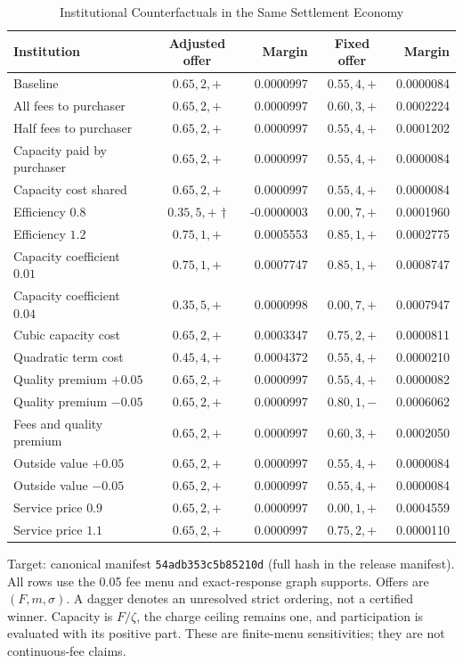 \begin{table}[t]
\caption{Institutional Counterfactuals in the Same Settlement Economy}\label{tab:institutions}
\centering
\footnotesize
\begin{tabular}{@{}lcrcr@{}}
\toprule
Institution & Adjusted offer & Margin & Fixed offer & Margin \\
\midrule
Baseline & $0.65,2,+$ & 0.0000997 & $0.55,4,+$ & 0.0000084 \\
All fees to purchaser & $0.65,2,+$ & 0.0000997 & $0.60,3,+$ & 0.0002224 \\
Half fees to purchaser & $0.65,2,+$ & 0.0000997 & $0.55,4,+$ & 0.0001202 \\
Capacity paid by purchaser & $0.65,2,+$ & 0.0000997 & $0.55,4,+$ & 0.0000084 \\
Capacity cost shared & $0.65,2,+$ & 0.0000997 & $0.55,4,+$ & 0.0000084 \\
Efficiency $0.8$ & $0.35,5,+$ $\dagger$ & -0.0000003 & $0.00,7,+$ & 0.0001960 \\
Efficiency $1.2$ & $0.75,1,+$ & 0.0005553 & $0.85,1,+$ & 0.0002775 \\
Capacity coefficient $0.01$ & $0.75,1,+$ & 0.0007747 & $0.85,1,+$ & 0.0008747 \\
Capacity coefficient $0.04$ & $0.35,5,+$ & 0.0000998 & $0.00,7,+$ & 0.0007947 \\
Cubic capacity cost & $0.65,2,+$ & 0.0003347 & $0.75,2,+$ & 0.0000811 \\
Quadratic term cost & $0.45,4,+$ & 0.0004372 & $0.55,4,+$ & 0.0000210 \\
Quality premium $+0.05$ & $0.65,2,+$ & 0.0000997 & $0.55,4,+$ & 0.0000082 \\
Quality premium $-0.05$ & $0.65,2,+$ & 0.0000997 & $0.80,1,-$ & 0.0006062 \\
Fees and quality premium & $0.65,2,+$ & 0.0000997 & $0.60,3,+$ & 0.0002050 \\
Outside value $+0.05$ & $0.65,2,+$ & 0.0000997 & $0.55,4,+$ & 0.0000084 \\
Outside value $-0.05$ & $0.65,2,+$ & 0.0000997 & $0.55,4,+$ & 0.0000084 \\
Service price $0.9$ & $0.65,2,+$ & 0.0000997 & $0.00,1,+$ & 0.0004559 \\
Service price $1.1$ & $0.65,2,+$ & 0.0000997 & $0.75,2,+$ & 0.0000110 \\
\bottomrule
\end{tabular}
\par\smallskip\begin{minipage}{\linewidth}\footnotesize Target: canonical manifest \texttt{54adb353c5b85210d} (full hash in the release manifest). All rows use the 0.05 fee menu and exact-response graph supports. Offers are $(F,m,\sigma)$. A dagger denotes an unresolved strict ordering, not a certified winner. Capacity is $F/\zeta$, the charge ceiling remains one, and participation is evaluated with its positive part. These are finite-menu sensitivities; they are not continuous-fee claims.\end{minipage}
\end{table}
